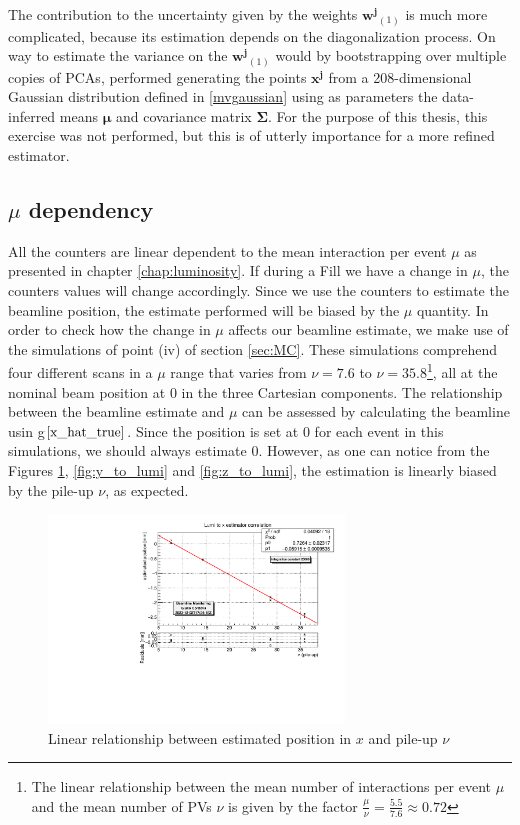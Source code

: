 The contribution to the uncertainty given by the weights $\mathbf{w^j}_{(1)}$ is much more complicated, because its estimation depends on the diagonalization process. On way to estimate the variance on the $\mathbf{w^j}_{(1)}$ would by bootstrapping over multiple copies of PCAs, performed generating the points $\mathbf{x^{j}}$ from a 208-dimensional Gaussian distribution defined in \eqref{mvgaussian} using as parameters the data-inferred means $\mathbf{\mu}$ and covariance matrix $\mathbf{\Sigma}$.  For the purpose of this thesis, this exercise was not performed, but this is of utterly importance for a more refined estimator.

\subsection{$\mu$ dependency}
All the counters are linear dependent to the mean interaction per event $\mu$ as presented in chapter \ref{chap:luminosity}. If during a Fill we have a change in $\mu$, the counters values will change accordingly. Since we use the counters to estimate the beamline position, the estimate performed will be biased by the $\mu$ quantity. In order to check how the change in $\mu$ affects our beamline estimate, we make use of the simulations 
of point (iv) of section \ref{sec:MC}. These simulations comprehend four different scans in a $\mu$ range that varies from $\nu=7.6$ to $\nu=35.8$\footnote{The linear relationship between the mean number of interactions per event $\mu$ and the mean number of PVs $\nu$ is given by the factor $\tfrac{\mu}{\nu}=\frac{5.5}{7.6}\approx 0.72$}, all at the nominal beam position at $0$ in the three Cartesian components. 
The relationship between the beamline estimate and $\mu$ can be assessed by calculating the beamline usin g$\ref{x_hat_true}$. Since the position is set at 0 for each event in this simulations, we should always estimate 0. However, as one can notice from the Figures \ref{fig:x_to_lumi}, \ref{fig:y_to_lumi} and \ref{fig:z_to_lumi}, the estimation is linearly biased by the pile-up $\nu$, as expected. 
\begin{figure}
    \centering
    \includegraphics[width=0.7\textwidth]{figures/x_to_lumi_fit_20000.pdf}
    \caption{Linear relationship between estimated position in $x$ and pile-up $\nu$}
    \label{fig:x_to_lumi}
\end{figure}
